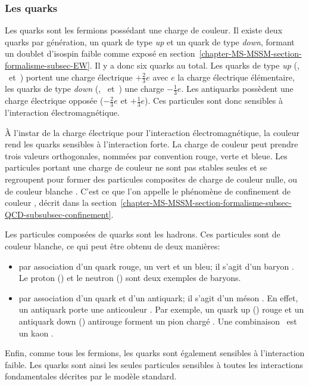\subsubsection{Les quarks}\label{chapter-MS-MSSM-section-SM_ptcs-subsec-fermions-subsubsec-quarks}
Les quarks sont les fermions possédant une charge de couleur.
Il existe deux quarks par génération, un quark de type \emph{up} et un quark de type \emph{down}, formant un doublet d'isospin faible comme exposé en section~\ref{chapter-MS-MSSM-section-formalisme-subsec-EW}.
Il y a donc six quarks au total. Les quarks de type \emph{up} (\quarku, \quarkc\ et~\quarkt) portent une charge électrique $+\frac{2}{3}e$ avec $e$ la charge électrique élémentaire, les quarks de type \emph{down} (\quarkd, \quarks\ et~\quarkb) une charge $-\frac{1}{3}e$. Les antiquarks possèdent une charge électrique opposée ($-\frac{2}{3}e$ et $+\frac{1}{3}e$). Ces particules sont donc sensibles à l'interaction électromagnétique.
\par À l'instar de la charge électrique pour l'interaction électromagnétique, la \og couleur \fg rend les quarks sensibles à l'interaction forte. La charge de couleur peut prendre trois valeurs orthogonales, nommées par convention rouge, verte et bleue. Les particules portant une charge de couleur ne sont pas stables seules et se regroupent pour former des particules composites de charge de couleur nulle, ou de couleur \og blanche \fg. C'est ce que l'on appelle le phénomène de \og confinement de couleur \fg, décrit dans la section~\ref{chapter-MS-MSSM-section-formalisme-subsec-QCD-subsubsec-confinement}.
\par Les particules composées de quarks sont les hadrons. Ces particules sont de couleur blanche, ce qui peut être obtenu de deux manières:
\begin{itemize}
\item par association d'un quark rouge, un vert et un bleu; il s'agit d'un \og baryon \fg. Le proton (\quarku\quarku\quarkd) et le neutron (\quarku\quarkd\quarkd) sont deux exemples de baryons.
\item par association d'un quark et d'un antiquark; il s'agit d'un \og méson \fg. En effet, un antiquark porte une \og anticouleur \fg. Par exemple, un quark up (\quarku) rouge et un antiquark down (\antiquarkd) \og antirouge \fg{} forment un pion chargé \pionplus. Une combinaison \quarku\antiquarks\ est un kaon \Kaonplus.
\end{itemize}
\par Enfin, comme tous les fermions, les quarks sont également sensibles à l'interaction faible. Les quarks sont ainsi les seules particules sensibles à toutes les interactions fondamentales décrites par le modèle standard.

